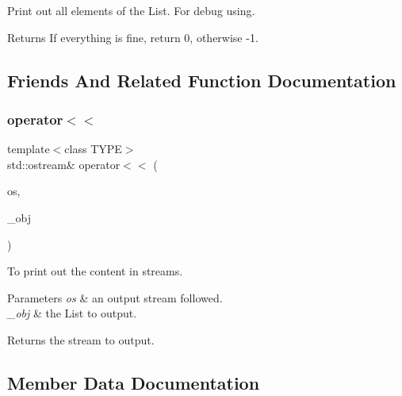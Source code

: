 Print out all elements of the List. For debug using.

\begin{DoxyReturn}{Returns}
If everything is fine, return 0, otherwise -\/1. 
\end{DoxyReturn}


\subsection{Friends And Related Function Documentation}
\mbox{\label{classCRAZYFISH_1_1LinkedList_a77f02bc38eca13d0374fd4b50b1b17a1}} 
\subsubsection{\texorpdfstring{operator$<$$<$}{operator<<}}
{\footnotesize\ttfamily template$<$class T\+Y\+PE$>$ \\
std\+::ostream\& operator$<$$<$ (\begin{DoxyParamCaption}\item[{std\+::ostream \&}]{os,  }\item[{const \hyperlink{classCRAZYFISH_1_1LinkedList}{Linked\+List}$<$ T\+Y\+PE $>$ \&}]{\+\_\+obj }\end{DoxyParamCaption})\hspace{0.3cm}{\ttfamily [friend]}}

To print out the content in streams.


\begin{DoxyParams}{Parameters}
{\em os} & an output stream followed. \\
\hline
{\em \+\_\+obj} & the List to output.\\
\hline
\end{DoxyParams}
\begin{DoxyReturn}{Returns}
the stream to output. 
\end{DoxyReturn}


\subsection{Member Data Documentation}
\mbox{\label{classCRAZYFISH_1_1LinkedList_aa964652536c838dbbe87900de5f8816e}} 
